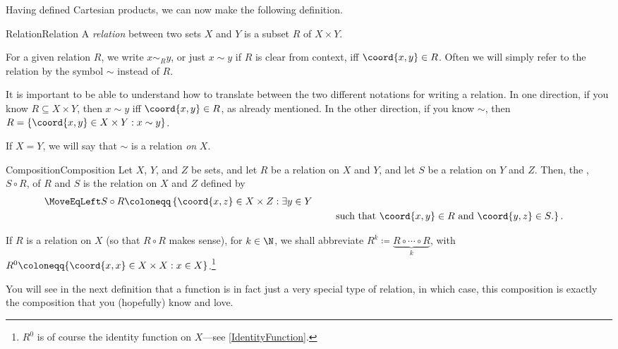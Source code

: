 Having defined Cartesian products, we can now make the following definition.
\begin{dfn}{Relation}{Relation}
A \emph{relation} between two sets $X$ and $Y$ is a subset $R$ of $X\times Y$.
\begin{rmk}
For a given relation $R$, we write $x\sim _Ry$, or just $x\sim y$ if $R$ is clear from context, iff $\coord{x,y}\in R$.  Often we will simply refer to the relation by the symbol $\sim$ instead of $R$.
\end{rmk}
\begin{rmk}
It is important to be able to understand how to translate between the two different notations for writing a relation.  In one direction, if you know $R\subseteq X\times Y$, then $x\sim y$ iff $\coord{x,y}\in R$, as already mentioned.  In the other direction, if you know $\sim$, then $R=\left\{ \coord{x,y}\in X\times Y:x\sim y\right\}$.
\end{rmk}
\begin{rmk}
If $X=Y$, we will say that $\sim$ is a relation \emph{on} $X$.
\end{rmk}
\end{dfn}
\begin{dfn}{Composition}{Composition}
Let $X$, $Y$, and $Z$ be sets, and let $R$ be a relation on $X$ and $Y$, and let $S$ be a relation on $Y$ and $Z$.  Then, the , $S\circ R$, of $R$ and $S$ is the relation on $X$ and $Z$ defined by
\begin{equation}
\begin{split}
\MoveEqLeft
S\circ R\coloneqq \left\{ \coord{x,z}\in X\times Z:\exists y\in Y\right. \\ & \qquad \left. \text{such that }\coord{x,y}\in R\text{ and }\coord{y,z}\in S\text{.}\right\} .
\end{split}
\end{equation}
\begin{rmk}
If $R$ is a relation on $X$ (so that $R\circ R$ makes sense), for $k\in \N$, we shall abbreviate $R^k\coloneqq \underbrace{R\circ \cdots \circ R}_k$, with $R^0\coloneqq \{ \coord{x,x}\in X\times X:x\in X\}$.\footnote{$R^0$ is of course the identity function on $X$---see \cref{IdentityFunction}.}
\end{rmk}
\begin{rmk}
You will see in the next definition that a function is in fact just a very special type of relation, in which case, this composition is exactly the composition that you (hopefully) know and love.
\end{rmk}
\end{dfn}
